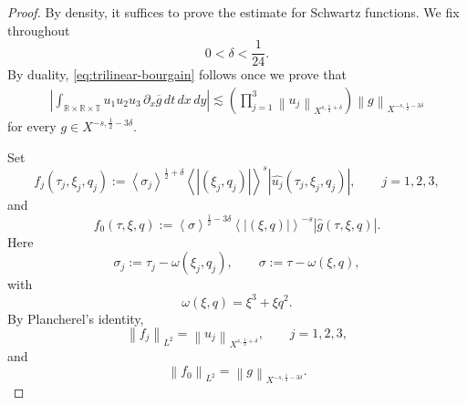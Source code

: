 \documentclass[12pt,oneside,reqno]{amsart}
\numberwithin{equation}{section}
\theoremstyle{plain}
\def\R{{\mathbb R}}
\def\T{{\mathbb T}}
\newcommand{\abs}[1]{%
    \left|#1\right|%
}
\newcommand{\inp}[1]{%
    \left\langle #1\right\rangle
}
\def\pt{\partial}
\newcommand{\Lpn}[2]{%
    \left\lVert #1\right\rVert_{L^{#2}}%
}
\newcommand{\xnorm}[3]{%
    \left\lVert #1\right\rVert_{X^{{#2},{#3}}}%
}
\newcommand{\Fh}[1]{\widehat{#1}}
\begin{document}
\begin{proof}
By density, it suffices to prove the estimate for Schwartz functions.
We fix throughout
\begin{equation}
\label{eq:delta-global-choice}
    0<\delta<\frac1{24}.
\end{equation}
By duality, \eqref{eq:trilinear-bourgain} follows once we prove that
\begin{equation}
\label{eq:trilinear-duality}
\begin{aligned}
    \left|
    \int_{\R\times\R\times\T}
        u_1u_2u_3\,\pt_x\overline{g}
        \,dt\,dx\,dy
    \right|
    \lesssim
    \left(
        \prod_{j=1}^3
        \xnorm{u_j}{s}{\frac12+\delta}
    \right)
    \xnorm{g}{-s}{\frac12-3\delta}
\end{aligned}
\end{equation}
for every $g\in X^{-s,\frac12-3\delta}$.

Set
\begin{equation}
\label{eq:weighted-input-profiles}
    f_j(\tau_j,\xi_j,q_j)
    :=
    \inp{\sigma_j}^{\frac12+\delta}
    \inp{\abs{(\xi_j,q_j)}}^s
    \abs{\Fh{u_j}(\tau_j,\xi_j,q_j)},
    \qquad
    j=1,2,3,
\end{equation}
and
\begin{equation}
\label{eq:weighted-output-profile}
    f_0(\tau,\xi,q)
    :=
    \inp{\sigma}^{\frac12-3\delta}
    \inp{\abs{(\xi,q)}}^{-s}
    \abs{\Fh{g}(\tau,\xi,q)}.
\end{equation}
Here
\begin{equation}
    \sigma_j
    :=
    \tau_j-\omega(\xi_j,q_j),
    \qquad
    \sigma
    :=
    \tau-\omega(\xi,q),
\end{equation}
with
\begin{equation}
    \omega(\xi,q)
    =
    \xi^3+\xi q^2.
\end{equation}
By Plancherel's identity,
\begin{equation}
\label{eq:profiles-L2-norms}
    \Lpn{f_j}{2}
    =
    \xnorm{u_j}{s}{\frac12+\delta},
    \qquad
    j=1,2,3,
\end{equation}
and
\begin{equation}
\label{eq:output-profile-L2}
    \Lpn{f_0}{2}
    =
    \xnorm{g}{-s}{\frac12-3\delta}.
\end{equation}


\end{proof}
\end{document}
